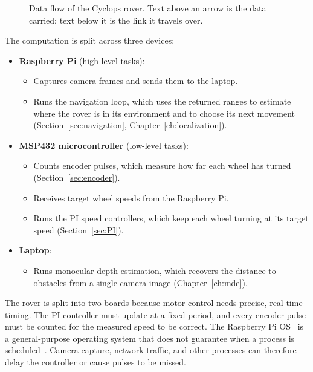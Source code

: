 \begin{figure}[!htb]
  \centering
  
  \caption{Data flow of the Cyclops rover. Text above an arrow is the data carried; text
    below it is the link it travels over. }
  \label{fig:data-flow}
\end{figure}

The computation is split across three devices:
\begin{itemize}
  \item \textbf{Raspberry Pi} (high-level tasks):
  \begin{itemize}
    \item Captures camera frames and sends them to the laptop.
    \item Runs the navigation loop, which uses the returned ranges to estimate where the
      rover is in its environment and to choose its next movement
      (Section~\ref{sec:navigation}, Chapter~\ref{ch:localization}).
  \end{itemize}
  \item \textbf{MSP432 microcontroller} (low-level tasks):
  \begin{itemize}
    \item Counts encoder pulses, which measure how far each wheel has turned
      (Section~\ref{sec:encoder}).
    \item Receives target wheel speeds from the Raspberry Pi.
    \item Runs the PI speed controllers, which keep each wheel turning at its target speed
      (Section~\ref{sec:PI}).
  \end{itemize}
  \item \textbf{Laptop}:
  \begin{itemize}
    \item Runs monocular depth estimation, which recovers the distance to obstacles from a
      single camera image (Chapter~\ref{ch:mde}).
  \end{itemize}
\end{itemize}

The rover is split into two boards because motor control needs precise, real-time
timing. The PI controller must update at a fixed period, and every encoder pulse must be
counted for the measured speed to be correct. The Raspberry Pi OS~\cite{rpi_os} is a
general-purpose operating system that does not guarantee when a process is
scheduled~\cite{reghenzani2019rtlinux}. Camera capture, network traffic, and other
processes can therefore delay the controller or cause pulses to be missed.

